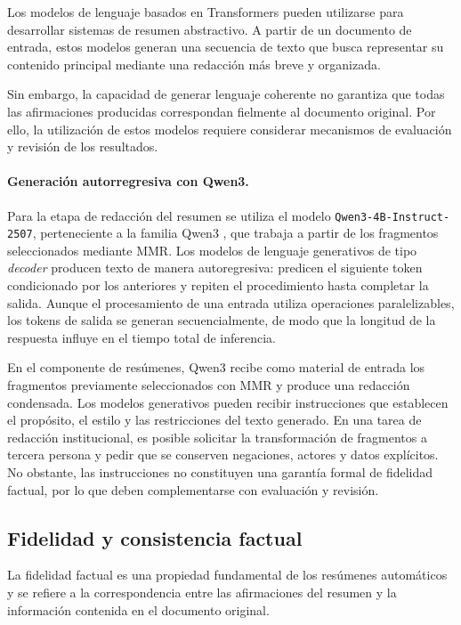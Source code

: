 Los modelos de lenguaje basados en Transformers pueden utilizarse para desarrollar sistemas de resumen abstractivo. A partir de un documento de entrada, estos modelos generan una secuencia de texto que busca representar su contenido principal mediante una redacción más breve y organizada.

Sin embargo, la capacidad de generar lenguaje coherente no garantiza que todas las afirmaciones producidas correspondan fielmente al documento original. Por ello, la utilización de estos modelos requiere considerar mecanismos de evaluación y revisión de los resultados.

\paragraph{Generación autorregresiva con Qwen3.}

Para la etapa de redacción del resumen se utiliza el modelo \texttt{Qwen3-4B-Instruct-2507}, perteneciente a la familia Qwen3 \cite{hf_qwen3_4b_instruct_2507}, que trabaja a partir de los fragmentos seleccionados mediante MMR. Los modelos de lenguaje generativos de tipo \textit{decoder} producen texto de manera autoregresiva: predicen el siguiente token condicionado por los anteriores y repiten el procedimiento hasta completar la salida. Aunque el procesamiento de una entrada utiliza operaciones paralelizables, los tokens de salida se generan secuencialmente, de modo que la longitud de la respuesta influye en el tiempo total de inferencia.

En el componente de resúmenes, Qwen3 recibe como material de entrada los fragmentos previamente seleccionados con MMR y produce una redacción condensada. Los modelos generativos pueden recibir instrucciones que establecen el propósito, el estilo y las restricciones del texto generado. En una tarea de redacción institucional, es posible solicitar la transformación de fragmentos a tercera persona y pedir que se conserven negaciones, actores y datos explícitos. No obstante, las instrucciones no constituyen una garantía formal de fidelidad factual, por lo que deben complementarse con evaluación y revisión.

\subsection{Fidelidad y consistencia factual}

La fidelidad factual es una propiedad fundamental de los resúmenes automáticos y se refiere a la correspondencia entre las afirmaciones del resumen y la información contenida en el documento original.

